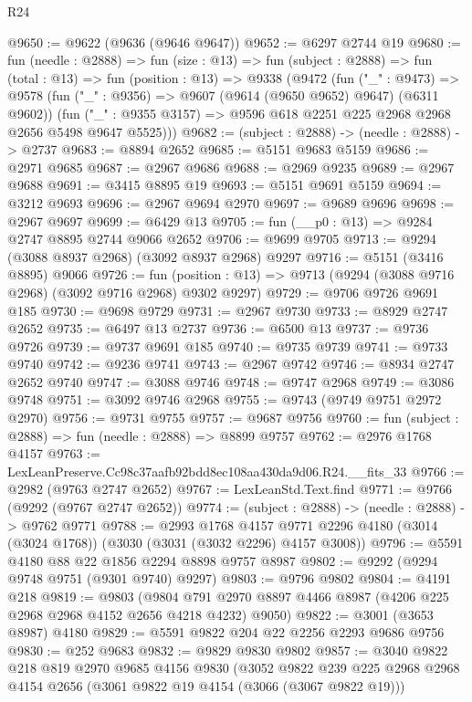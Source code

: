 \begin{lexlean}{R24}
\begin{coremodule}
@9650 := @9622 (@9636 (@9646 @9647))
@9652 := @6297 @2744 @19
@9680 := fun (needle : @2888) =>
  fun (size : @13) =>
  fun (subject : @2888) =>
  fun (total : @13) =>
  fun (position : @13) =>
  @9338
    (@9472
      (fun ("_" : @9473) =>
      @9578
        (fun ("_" : @9356) => @9607 (@9614 (@9650 @9652) @9647) (@6311 @9602))
        (fun ("_" : @9355 @3157) => @9596 @618 @2251 @225 @2968 @2968 @2656 @5498 @9647 @5525)))
@9682 := (subject : @2888) -> (needle : @2888) -> @2737
@9683 := @8894 @2652
@9685 := @5151 @9683 @5159
@9686 := @2971 @9685
@9687 := @2967 @9686
@9688 := @2969 @9235
@9689 := @2967 @9688
@9691 := @3415 @8895 @19
@9693 := @5151 @9691 @5159
@9694 := @3212 @9693
@9696 := @2967 @9694 @2970
@9697 := @9689 @9696
@9698 := @2967 @9697
@9699 := @6429 @13
@9705 := fun (__p0 : @13) => @9284 @2747 @8895 @2744 @9066 @2652
@9706 := @9699 @9705
@9713 := @9294 (@3088 @8937 @2968) (@3092 @8937 @2968) @9297
@9716 := @5151 (@3416 @8895) @9066
@9726 := fun (position : @13) => @9713 (@9294 (@3088 @9716 @2968) (@3092 @9716 @2968) @9302 @9297)
@9729 := @9706 @9726 @9691 @185
@9730 := @9698 @9729
@9731 := @2967 @9730
@9733 := @8929 @2747 @2652
@9735 := @6497 @13 @2737
@9736 := @6500 @13
@9737 := @9736 @9726
@9739 := @9737 @9691 @185
@9740 := @9735 @9739
@9741 := @9733 @9740
@9742 := @9236 @9741
@9743 := @2967 @9742
@9746 := @8934 @2747 @2652 @9740
@9747 := @3088 @9746
@9748 := @9747 @2968
@9749 := @3086 @9748
@9751 := @3092 @9746 @2968
@9755 := @9743 (@9749 @9751 @2972 @2970)
@9756 := @9731 @9755
@9757 := @9687 @9756
@9760 := fun (subject : @2888) => fun (needle : @2888) => @8899 @9757
@9762 := @2976 @1768 @4157
@9763 := LexLeanPreserve.Cc98c37aafb92bdd8ec108aa430da9d06.R24.__fits_33
@9766 := @2982 (@9763 @2747 @2652)
@9767 := LexLeanStd.Text.find
@9771 := @9766 (@9292 (@9767 @2747 @2652))
@9774 := (subject : @2888) -> (needle : @2888) -> @9762 @9771
@9788 := @2993
    @1768
    @4157
    @9771
    @2296
    @4180
    (@3014 (@3024 @1768))
    (@3030 (@3031 (@3032 @2296) @4157 @3008))
@9796 := @5591 @4180 @88 @22 @1856 @2294 @8898 @9757 @8987
@9802 := @9292 (@9294 @9748 @9751 (@9301 @9740) @9297)
@9803 := @9796 @9802
@9804 := @4191 @218
@9819 := @9803
    (@9804 @791 @2970 @8897 @4466 @8987 (@4206 @225 @2968 @2968 @4152 @2656 @4218 @4232) @9050)
@9822 := @3001 (@3653 @8987) @4180
@9829 := @5591 @9822 @204 @22 @2256 @2293 @9686 @9756
@9830 := @252 @9683
@9832 := @9829 @9830 @9802
@9857 := @3040
    @9822
    @218
    @819
    @2970
    @9685
    @4156
    @9830
    (@3052
      @9822
      @239
      @225
      @2968
      @2968
      @4154
      @2656
      (@3061 @9822 @19 @4154 (@3066 (@3067 @9822 @19)))

\end{coremodule}
\end{lexlean}
